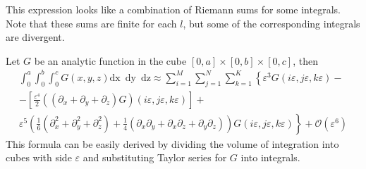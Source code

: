 \documentclass{article}
\newcommand{\dx}{\mathrm{dx}~}
\newcommand{\dy}{\mathrm{dy}~}
\newcommand{\dz}{\mathrm{dz}}
\begin{document}
This expression looks like a combination of Riemann sums for some integrals. Note that these sums
are finite for each $l$, but some of the corresponding integrals are divergent.


Let $G$ be an analytic function in the cube $[0,a]\times[0,b]\times[0,c]$, then
\begin{multline}
  \label{eq:21}
  \int_{0}^{a} \int_{0}^{b}\int_{0}^{c}G(x,y,z) \dx\; \dy\;
  \dz\approx\sum_{i=1}^{M}\sum_{j=1}^{N}\sum_{k=1}^{K}\left\{\varepsilon^{3}G\left(i\varepsilon,j\varepsilon,k\varepsilon\right)-\right.\\
  \left.-\left[\frac{\varepsilon^{4}}{2}\left((\partial_{x}+\partial_{y}+\partial_{z})G\right)(i\varepsilon,j\varepsilon,k\varepsilon)\right]+\right.\\
  \left.\varepsilon^{5}\left(\frac{1}{6}(\partial_{x}^{2}+\partial_{y}^{2}+\partial_{z}^{2})+\frac{1}{4}(\partial_{x}\partial_{y}+\partial_{x}\partial_{z}+\partial_{y}\partial_{z})\right)G\left(i\varepsilon,j\varepsilon,k\varepsilon\right)
  \right\}+\mathcal{O}(\varepsilon^{6})
\end{multline}
This formula can be easily derived by dividing the volume of integration into cubes with side
$\varepsilon$ and substituting Taylor series for $G$ into integrals.
\end{document}
